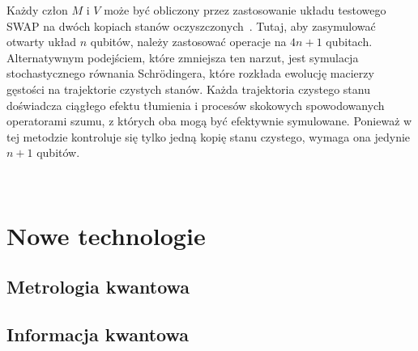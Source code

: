 \documentclass[a4paper,11pt]{article}
\begin{document}
Każdy człon $M$ i $V$ może być obliczony przez zastosowanie układu testowego 
SWAP na dwóch kopiach stanów oczyszczonych~. Tutaj, aby zasymulować otwarty układ $n$ qubitów, należy zastosować operacje na $4n+1$ qubitach. Alternatywnym podejściem, które zmniejsza ten narzut, jest symulacja stochastycznego równania Schr\"odingera, które rozkłada ewolucję macierzy gęstości na trajektorie czystych stanów. Każda trajektoria czystego stanu doświadcza ciągłego efektu tłumienia i procesów skokowych spowodowanych operatorami szumu, z których oba mogą być efektywnie symulowane. Ponieważ w tej metodzie kontroluje się tylko jedną kopię stanu czystego, wymaga ona jedynie $n+1$ qubitów. 

\newpage
\ 
\newpage

\section{Nowe technologie}

\newpage
\subsection{Metrologia kwantowa}
\newpage
\subsection{Informacja kwantowa}
\end{document}
